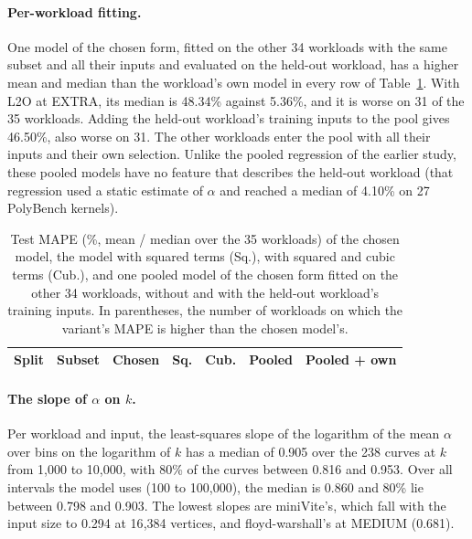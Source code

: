 \documentclass[11pt]{article}
\newcommand{\tabinput}[1]{}
\begin{document}
\paragraph{Per-workload fitting.} One model of the chosen form, fitted on the other 34 workloads with the same subset
and all their inputs and evaluated on the held-out workload, has a higher mean and median than the workload's own model in every row of
Table~\ref{tab:modelcheck}. With L2O at EXTRA, its median is 48.34\% against 5.36\%, and it is worse on 31 of the 35
workloads. Adding the held-out workload's training inputs to the pool gives 46.50\%, also worse on 31. The other
workloads enter the pool with all their inputs and their own selection. Unlike the pooled
regression of the earlier study, these pooled models have no feature that describes the held-out workload (that
regression used a static estimate of $\alpha$ and reached a median of 4.10\% on 27 PolyBench kernels).

\begin{table}[t]
\centering
\caption{Test MAPE (\%, mean / median over the 35 workloads) of the chosen model, the model with squared terms (Sq.),
with squared and cubic terms (Cub.), and one pooled model of the chosen form fitted on the other 34 workloads, without
and with the held-out workload's training inputs. In parentheses, the number of workloads on which the variant's MAPE
is higher than the chosen model's.}
\label{tab:modelcheck}
\footnotesize
\setlength{\tabcolsep}{4pt}
\begin{tabular}{@{}llrrrrr@{}}
\toprule
Split & Subset & Chosen & Sq. & Cub. & Pooled & Pooled + own \\
\midrule
\tabinput{modelcheck}
\bottomrule
\end{tabular}
\end{table}

\paragraph{The slope of $\alpha$ on $k$.} Per workload and input, the least-squares slope of the logarithm of the
mean $\alpha$ over bins on the logarithm of $k$ has a median of 0.905 over the 238 curves at $k$ from 1{,}000 to
10{,}000, with 80\% of the curves between 0.816 and 0.953. Over all intervals the model uses (100 to 100{,}000), the
median is 0.860 and 80\% lie between 0.798 and 0.903. The lowest slopes are miniVite's, which fall with the input
size to 0.294 at 16{,}384 vertices, and floyd-warshall's at MEDIUM (0.681).
\end{document}
